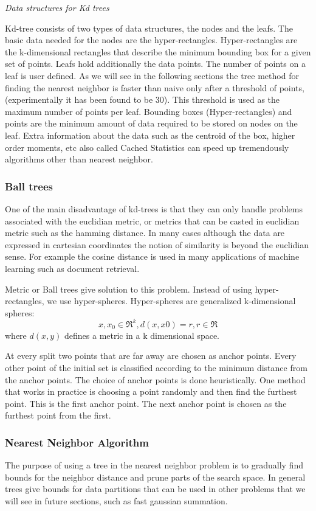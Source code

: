 \documentclass[12pt,letterpaper,doublespaced,ETD,dvips,proposal]{gtthesis}
\begin{document}
\begin{Body}
\emph{Data structures for Kd trees}

 Kd-tree consists of two types of data structures, the nodes and the
 leafs. The basic data needed for the nodes are the
 hyper-rectangles. Hyper-rectangles are the k-dimensional rectangles
 that describe the minimum bounding box  for a given set of points.
 Leafs hold additionally the data points. The number of points on a
 leaf is user defined. As we will see in the following sections the
 tree method for finding the nearest neighbor is faster than naive
 only after a threshold of points, (experimentally it has been found
 to be 30). This threshold is used as the maximum number of points
 per leaf. Bounding boxes (Hyper-rectangles) and points are the minimum amount
 of data required to be stored on nodes on the leaf. Extra
 information about the data such as the centroid of the box, higher
 order moments, etc also called Cached Statistics can speed up
 tremendously algorithms other than nearest neighbor.


\subsubsection{Ball trees}
One of the main disadvantage of kd-trees is that they can only
handle problems associated with the euclidian metric, or metrics
that can be casted in euclidian metric such as the hamming distance.
In many cases although the data are expressed in cartesian
coordinates the notion of similarity is beyond the euclidian sense.
For example the cosine distance is used in many applications of
machine learning such as document retrieval.

Metric or Ball trees give solution to this problem. Instead of using
hyper-rectangles, we use hyper-spheres. Hyper-spheres are
generalized k-dimensional spheres:
\begin{equation}
x,x_0 \in \Re^k , d(x,x0)=r, r\in \Re
\end{equation}
where $d(x, y)$ defines a metric in a k dimensional space.

At every split two points that are far away are chosen as anchor
points. Every other point of the initial set is classified according
to the minimum distance from the anchor points. The choice of anchor
points is done heuristically. One method that works in practice is
choosing a point randomly and then find the furthest point. This is
the first anchor point. The next anchor point is chosen as the
furthest point from the first.
\subsubsection{Nearest Neighbor Algorithm}
The purpose of using a tree in the nearest neighbor problem is to
gradually find bounds for the neighbor distance and prune parts of
the search space. In general trees give bounds for data partitions
that can be used in other problems that we will see in future
sections, such as fast gaussian summation.


\end{Body}
\end{document}
